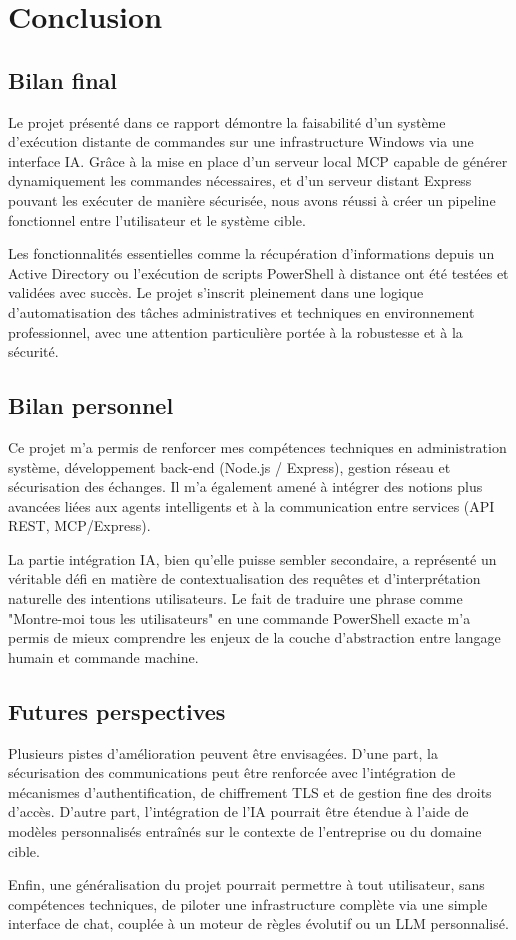 \section{Conclusion}

\subsection*{Bilan final}

Le projet présenté dans ce rapport démontre la faisabilité d’un système d’exécution distante de commandes sur une infrastructure Windows via une interface IA. Grâce à la mise en place d’un serveur local MCP capable de générer dynamiquement les commandes nécessaires, et d’un serveur distant Express pouvant les exécuter de manière sécurisée, nous avons réussi à créer un pipeline fonctionnel entre l’utilisateur et le système cible. 

Les fonctionnalités essentielles comme la récupération d’informations depuis un Active Directory ou l’exécution de scripts PowerShell à distance ont été testées et validées avec succès. Le projet s’inscrit pleinement dans une logique d’automatisation des tâches administratives et techniques en environnement professionnel, avec une attention particulière portée à la robustesse et à la sécurité.

\subsection*{Bilan personnel}

Ce projet m’a permis de renforcer mes compétences techniques en administration système, développement back-end (Node.js / Express), gestion réseau et sécurisation des échanges. Il m’a également amené à intégrer des notions plus avancées liées aux agents intelligents et à la communication entre services (API REST, MCP/Express).

La partie intégration IA, bien qu’elle puisse sembler secondaire, a représenté un véritable défi en matière de contextualisation des requêtes et d’interprétation naturelle des intentions utilisateurs. Le fait de traduire une phrase comme "Montre-moi tous les utilisateurs" en une commande PowerShell exacte m’a permis de mieux comprendre les enjeux de la couche d’abstraction entre langage humain et commande machine.

\subsection*{Futures perspectives}

Plusieurs pistes d’amélioration peuvent être envisagées. D’une part, la sécurisation des communications peut être renforcée avec l’intégration de mécanismes d’authentification, de chiffrement TLS et de gestion fine des droits d’accès. D’autre part, l’intégration de l’IA pourrait être étendue à l’aide de modèles personnalisés entraînés sur le contexte de l’entreprise ou du domaine cible.

Enfin, une généralisation du projet pourrait permettre à tout utilisateur, sans compétences techniques, de piloter une infrastructure complète via une simple interface de chat, couplée à un moteur de règles évolutif ou un LLM personnalisé.

